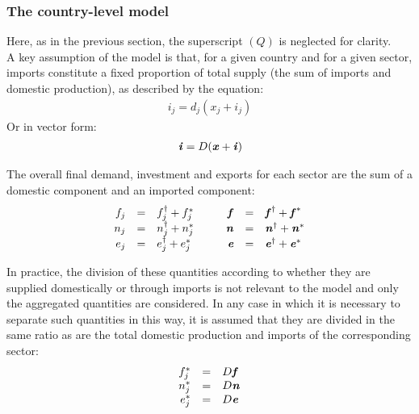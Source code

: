 \documentclass[preprint,authoryear,3p]{elsarticle}
\begin{document}
\subsubsection{The country-level model} \label{countrymod}

\noindent Here, as in the previous section, the superscript $(Q)$ is neglected for clarity. \\

\noindent A key assumption of the model is that, for a given country and for a given sector, imports constitute a fixed proportion of total supply (the sum of imports and domestic production), as described by the equation:
\begin{align} \label{di_assumption}
i_{j} = d_{j} ( x_{j} + i_{j} )
\end{align}
Or in vector form:
\begin{align} \label{di_assumption_v}
\textbf{\textit{i}} = D ( \textbf{\textit{x}} + \textbf{\textit{i}} )
\end{align}

\noindent The overall final demand, investment and exports for each sector are the sum of a domestic component and an imported component:
$$
\begin{array}{rclcrcl}
f_j &=& f_j^\dag + f_j^* & \; \; \;  & \textbf{\textit{f}} &=& \textbf{\textit{f}}^\dag + \textbf{\textit{f}}^* \\
n_j &=& n_j^\dag + n_j^* & \; \; \; & \textbf{\textit{n}} &=& \textbf{\textit{n}}^\dag + \textbf{\textit{n}}^* \\
e_j &=& e_j^\dag + e_j^* & \; \; \; &\textbf{\textit{e}} &=& \textbf{\textit{e}}^\dag + \textbf{\textit{e}}^*
\end{array}
$$

\noindent In practice, the division of these quantities according to whether they are supplied domestically or through imports is not relevant to the model and only the aggregated quantities are considered. In any case in which it is necessary to separate such quantities in this way, it is assumed that they are divided in the same ratio as are the total domestic production and imports of the corresponding sector: \\
$$
\begin{array}{rclcrcl}
f^*_j &=& D \textbf{\textit{f}}  \\
n^*_j &=& D \textbf{\textit{n}}  \\
e^*_j &=& D \textbf{\textit{e}}  
\end{array}
$$
\end{document}
